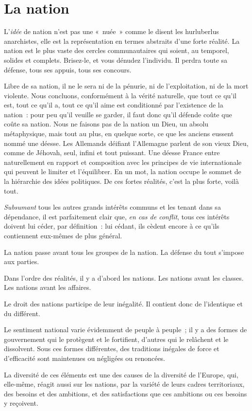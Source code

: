 \documentclass[french,twoside]{book} %
\newcommand{\astermono}{\medskip\centerline{\color{rubric}\large\selectfont{\syms ✻}}\medskip\par}%
\begin{document}
\section[La nation]{La nation}
\noindent L’\emph{idée} de nation n’est pas une « nuée » comme le disent les hurluberlus anarchistes, elle est la représentation en termes abstraits d’une forte réalité. La nation est le plus vaste des cercles communautaires qui soient, au temporel, solides et complets. Brisez-le, et vous dénudez l’individu. Il perdra toute sa défense, tous ses appuis, tous ses concours.\par
Libre de sa nation, il ne le sera ni de la pénurie, ni de l’exploitation, ni de la mort violente. Nous concluons, conformément à la vérité naturelle, que tout ce qu’il est, tout ce qu’il a, tout ce qu’il aime est conditionné par l’existence de la nation : pour peu qu’il veuille se garder, il faut donc qu’il défende coûte que coûte sa nation. Nous ne faisons pas de la nation un Dieu, un absolu métaphysique, mais tout au plus, en quelque sorte, ce que les anciens eussent nommé une déesse. Les Allemands déifiant l’Allemagne parlent de son vieux Dieu, comme de Jéhovah, seul, infini et tout puissant. Une déesse France entre naturellement en rapport et composition avec les principes de vie internationale qui peuvent le limiter et l’équilibrer. En un mot, la nation occupe le sommet de la hiérarchie des idées politiques. De ces fortes réalités, c’est la plus forte, voilà tout.\par
\emph{Subsumant} tous les autres grands intérêts communs et les tenant dans sa dépendance, il est parfaitement clair que, \emph{en cas de conflit}, tous ces intérêts doivent lui céder, par définition : lui cédant, ils cèdent encore à ce qu’ils contiennent eux-mêmes de plus général.\par

\astermono

\noindent La nation passe avant tous les groupes de la nation. La défense du tout s’impose aux parties.\par

\astermono

\noindent Dans l’ordre des réalités, il y a d’abord les nations. Les nations avant les classes. Les nations avant les affaires.\par

\astermono

\noindent Le droit des nations participe de leur inégalité. Il contient donc de l’identique et du différent.\par
Le sentiment national varie évidemment de peuple à peuple ; il y a des formes de gouvernement qui le protègent et le fortifient, d’autres qui le relâchent et le dissolvent. Sous ces formes différentes, des traditions inégales de force et d’efficacité sont maintenues ou négligées ou renoncées.\par
La diversité de ces éléments est une des causes de la diversité de l’Europe, qui, elle-même, réagit aussi sur les nations, par la variété de leurs cadres territoriaux, des besoins et des ambitions, et des satisfactions que ces ambitions ou ces besoins y reçoivent.\par
\end{document}
